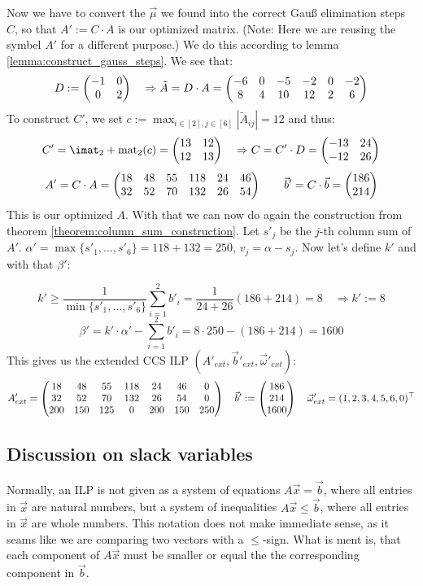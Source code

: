 Now we have to convert the $\vec\mu$ we found into the correct Gauß elimination steps $C$, so that $A' := C\cdot A$ is our optimized matrix. (Note: Here we are reusing the symbel $A'$ for a different purpose.) We do this according to lemma \ref{lemma:construct_gauss_steps}. We see that:
$$D := \left(\begin{matrix}-1&0\\0&2\end{matrix}\right) \quad\Rightarrow \tilde A = D \cdot A = \left(\begin{matrix}-6&0&-5&-2&0&-2\\8&4&10&12&2&6\end{matrix}\right)$$
To construct $C'$, we set $c := \max_{i\in[2], j\in[6]}|\tilde A_{ij}| = 12$ and thus:
$$C' = \imat_2 + \opmat_2(c) = \mat{13&12\\12&13} \quad\Rightarrow C = C'\cdot D = \mat{-13&24\\-12&26}$$
$$A' = C \cdot A = \left(\begin{matrix}18&48&55&118&24&46\\32&52&70&132&26&54\end{matrix}\right)\qquad \vec b' = C\cdot \vec b = \left(\begin{matrix}186\\214\end{matrix}\right)$$
This is our optimized $A$. With that we can now do again the construction from theorem \ref{theorem:column_sum_construction}. Let $s'_j$ be the $j$-th column sum of $A'$. $\alpha' = \max\{s'_1, \dots, s'_6\} = 118+132=250$, $v_j = \alpha - s_j$. Now let's define $k'$ and with that $\beta'$:

$$k' \geq \frac{1}{\min\{s'_1, \dots, s'_6\}} \sum_{i=1}^{2}b'_i = \frac{1}{24+26}(186+214) = 8 \quad \Rightarrow k' := 8$$ 
$$\beta' = k'\cdot\alpha' - \sum_{i=1}^{2}b'_i = 8\cdot250-(186+214) = 1600$$
This gives us the extended CCS ILP $(A'_{ext}, \vec b'_{ext}, \vec\omega'_{ext})$:
$$A'_{ext} = \left(\begin{matrix}18&48&55&118&24&46&0\\32&52&70&132&26&54&0\\200&150&125&0&200&150&250\end{matrix}\right)\quad\vec b':= \left(\begin{matrix}186\\214\\1600\end{matrix}\right)\quad \vec\omega'_{ext} = (1, 2, 3, 4, 5, 6, 0)^\top$$

\subsection{Discussion on slack variables}
Normally, an ILP is not given as a system of equations $A\vec x = \vec b$, where all entries in $\vec x$ are natural numbers, but a system of inequalities $A\vec x \leq \vec b$, where all entries in $\vec x$ are whole numbers. This notation does not make immediate sense, as it seams like we are comparing two vectors with a $\leq$-sign. What is ment is, that each component of $A\vec x$ must be smaller or equal the the corresponding component in $\vec b$. 

